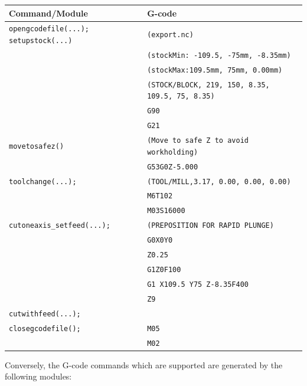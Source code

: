 \documentclass{ltxdoc}
\begin{document}
\noindent \begin{tabular}{@{}ll@{}} \toprule
 Command/Module                    & G-code                                        \\ \midrule
 \texttt{opengcodefile(...);}
 \texttt{setupstock(...)}          & \texttt{(export.nc)}                          \\
                                   & \texttt{(stockMin: -109.5, -75mm, -8.35mm)}\\
                                   & \texttt{(stockMax:109.5mm, 75mm, 0.00mm)}\\
                                   & \texttt{(STOCK/BLOCK, 219, 150, 8.35, 109.5, 75, 8.35)}\\
                                   & \texttt{G90}\\
                                   & \texttt{G21} \\ \midrule
 \texttt{movetosafez()}            & \texttt{(Move to safe Z to avoid workholding)}\\
                                   & \texttt{G53G0Z-5.000}\\ \midrule
 \texttt{toolchange(...);}         & \texttt{(TOOL/MILL,3.17, 0.00, 0.00, 0.00)} \\
                                   & \texttt{M6T102} \\
                                   & \texttt{M03S16000} \\ \midrule
 \verb|cutoneaxis_setfeed(...);|   & \texttt{(PREPOSITION FOR RAPID PLUNGE)}\\
  & \texttt{G0X0Y0} \\
  & \texttt{Z0.25} \\
  & \texttt{G1Z0F100} \\
  & \texttt{G1 X109.5 Y75 Z-8.35F400} \\
  & \texttt{Z9}\\
 \texttt{cutwithfeed(...);}\\ \midrule

 \texttt{closegcodefile();}        & \texttt{M05}\\
                                   & \texttt{M02}\\ 
\bottomrule
\end{tabular}
\bigskip



\noindent Conversely, the G-code commands which are supported are generated by the following modules:

\bigskip
\end{document}

